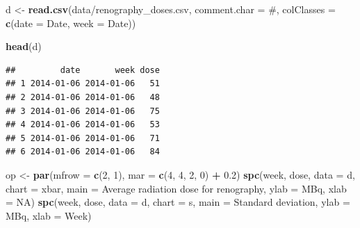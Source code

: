 \documentclass[
]{book}
\newenvironment{Shaded}{\begin{snugshade}}{\end{snugshade}}
\newcommand{\AttributeTok}[1]{\textcolor[rgb]{0.13,0.29,0.53}{#1}}
\newcommand{\ConstantTok}[1]{\textcolor[rgb]{0.56,0.35,0.01}{#1}}
\newcommand{\DecValTok}[1]{\textcolor[rgb]{0.00,0.00,0.81}{#1}}
\newcommand{\FloatTok}[1]{\textcolor[rgb]{0.00,0.00,0.81}{#1}}
\newcommand{\FunctionTok}[1]{\textcolor[rgb]{0.13,0.29,0.53}{\textbf{#1}}}
\newcommand{\NormalTok}[1]{#1}
\newcommand{\OtherTok}[1]{\textcolor[rgb]{0.56,0.35,0.01}{#1}}
\newcommand{\SpecialCharTok}[1]{\textcolor[rgb]{0.81,0.36,0.00}{\textbf{#1}}}
\newcommand{\StringTok}[1]{\textcolor[rgb]{0.31,0.60,0.02}{#1}}
\begin{document}
\begin{Shaded}
\begin{Highlighting}[]
\NormalTok{d }\OtherTok{\textless{}{-}} \FunctionTok{read.csv}\NormalTok{(}\StringTok{\textquotesingle{}data/renography\_doses.csv\textquotesingle{}}\NormalTok{,}
              \AttributeTok{comment.char =} \StringTok{\textquotesingle{}\#\textquotesingle{}}\NormalTok{,}
              \AttributeTok{colClasses =} \FunctionTok{c}\NormalTok{(}\AttributeTok{date =} \StringTok{\textquotesingle{}Date\textquotesingle{}}\NormalTok{,}
                             \AttributeTok{week =} \StringTok{\textquotesingle{}Date\textquotesingle{}}\NormalTok{))}

\FunctionTok{head}\NormalTok{(d)}
\end{Highlighting}
\end{Shaded}

\begin{verbatim}
##         date       week dose
## 1 2014-01-06 2014-01-06   51
## 2 2014-01-06 2014-01-06   48
## 3 2014-01-06 2014-01-06   75
## 4 2014-01-06 2014-01-06   53
## 5 2014-01-06 2014-01-06   71
## 6 2014-01-06 2014-01-06   84
\end{verbatim}

\begin{Shaded}
\begin{Highlighting}[]
\NormalTok{op }\OtherTok{\textless{}{-}} \FunctionTok{par}\NormalTok{(}\AttributeTok{mfrow =} \FunctionTok{c}\NormalTok{(}\DecValTok{2}\NormalTok{, }\DecValTok{1}\NormalTok{),}
          \AttributeTok{mar   =} \FunctionTok{c}\NormalTok{(}\DecValTok{4}\NormalTok{, }\DecValTok{4}\NormalTok{, }\DecValTok{2}\NormalTok{, }\DecValTok{0}\NormalTok{) }\SpecialCharTok{+} \FloatTok{0.2}\NormalTok{)}
\FunctionTok{spc}\NormalTok{(week, dose,}
    \AttributeTok{data  =}\NormalTok{ d,}
    \AttributeTok{chart =} \StringTok{\textquotesingle{}xbar\textquotesingle{}}\NormalTok{,}
    \AttributeTok{main  =} \StringTok{\textquotesingle{}Average radiation dose for renography\textquotesingle{}}\NormalTok{,}
    \AttributeTok{ylab  =} \StringTok{\textquotesingle{}MBq\textquotesingle{}}\NormalTok{,}
    \AttributeTok{xlab  =} \ConstantTok{NA}\NormalTok{)}
\FunctionTok{spc}\NormalTok{(week, dose,}
    \AttributeTok{data  =}\NormalTok{ d,}
    \AttributeTok{chart =} \StringTok{\textquotesingle{}s\textquotesingle{}}\NormalTok{,}
    \AttributeTok{main  =} \StringTok{\textquotesingle{}Standard deviation\textquotesingle{}}\NormalTok{,}
    \AttributeTok{ylab  =} \StringTok{\textquotesingle{}MBq\textquotesingle{}}\NormalTok{,}
    \AttributeTok{xlab  =} \StringTok{\textquotesingle{}Week\textquotesingle{}}\NormalTok{)}
\end{Highlighting}
\end{Shaded}
\end{document}
